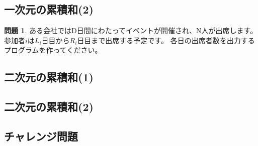 \documentclass[12pt,a4paper,dvipdfmx,fleqn]{article}%
\theoremstyle{definition}
\newtheorem*{toi*}{問題}
\theoremstyle{definition}
\theoremstyle{definition}
\begin{document}
\subsection{一次元の累積和(2)}\label{一次元の累積和(2)}
\begin{toi*}
    ある会社ではD日間にわたってイベントが開催され、N人が出席します。参加者$i$は$L_i$日目から$R_i$日目まで出席する予定です。
    各日の出席者数を出力するプログラムを作ってください。
\end{toi*}
\subsection{二次元の累積和(1)}\label{二次元の累積和(1)}
\subsection{二次元の累積和(2)}\label{二次元の累積和(2)}
\subsection{チャレンジ問題}\label{チャレンジ問題2}
\end{document}

